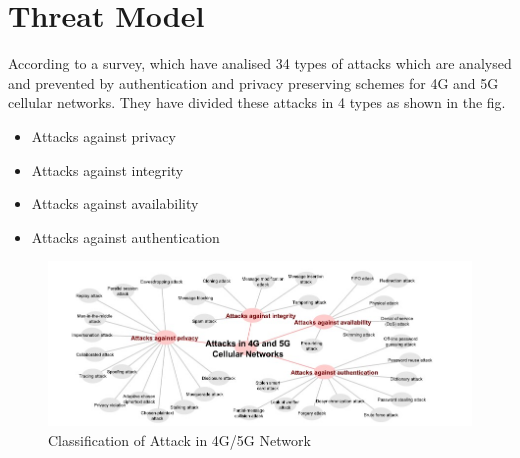 \section{Threat Model}
{
    
    According to a survey, which have analised 34 types of attacks which are analysed 
    and prevented by authentication and privacy preserving schemes for 4G
    and 5G cellular networks. They have divided these attacks in 4 types as shown in the fig.
    \begin{itemize}
        \item Attacks against privacy
        \item Attacks against integrity
        \item Attacks against availability
        \item Attacks against authentication
    \end{itemize}

    \begin{figure}[h]
        \centering
        \includegraphics[scale=0.73]{img/attack.jpg}
        \caption{Classification of Attack in 4G/5G Network}
    \end{figure}
    

}
    

